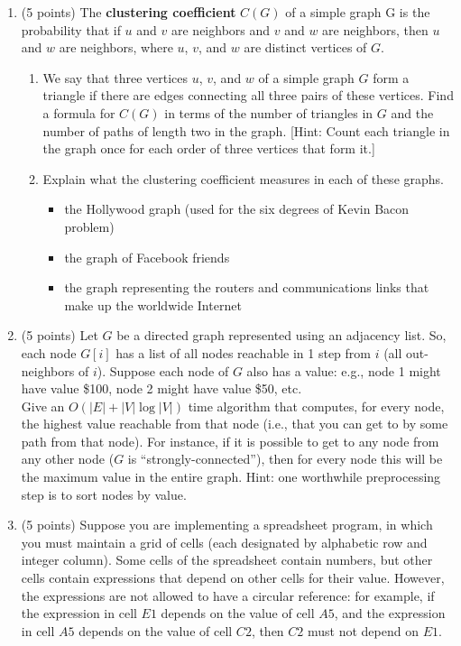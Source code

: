 \documentclass[12pt]{report}
\begin{document}
\maketitle

\begin{enumerate}[label=\arabic*.]
	\item (5 points) The \textbf{clustering coefficient} $C(G)$\label{def:cg} of a simple graph G is the probability that if $u$ and $v$ are neighbors and $v$ and $w$ are neighbors, then $u$ and $w$ are neighbors, where $u$, $v$, and $w$ are distinct vertices of $G$.
	\begin{enumerate}[label=\arabic{enumi}\alph*)]
	    \item We say that three vertices $u$, $v$, and $w$ of a simple graph $G$ form a triangle if there are edges connecting all three pairs of these vertices. Find a formula for \hyperref[def:cg]{$C(G)$} in terms of the number of triangles in $G$ and the number of paths of length two in the graph. [Hint: Count each triangle in the graph once for each order of three vertices that form it.]
		\item Explain what the clustering coefficient measures in each of these graphs.
		\begin{itemize}
			\item the Hollywood graph (used for the six degrees of Kevin Bacon problem)
			\item the graph of Facebook friends
			\item the graph representing the routers and communications links that make up the worldwide Internet
		\end{itemize}
	\end{enumerate}
	\item (5 points) Let $G$ be a directed graph represented using an adjacency list. So, each node $G[i]$ has a list of all nodes reachable in 1 step from $i$ (all out-neighbors of $i$). Suppose each node of $G$ also has a value: e.g., node 1 might have value \$100, node 2 might have value \$50, etc.\\
	Give an $O(|E| + |V | \log |V |)$ time algorithm that computes, for every node, the highest value reachable from that node (i.e., that you can get to by some path from that node). For instance, if it is possible to get to any node from any other node ($G$ is “strongly-connected”), then for every node this will be the maximum value in the entire graph. Hint: one worthwhile preprocessing step is to sort nodes by value.
	\item (5 points) Suppose you are implementing a spreadsheet program, in which you must maintain a grid of cells (each designated by alphabetic row and integer column). Some cells of the spreadsheet contain numbers, but other cells contain expressions that depend on other cells for their value. However, the expressions are not allowed to have a circular reference: for example, if the expression in cell $E1$ depends on the value of cell $A5$, and the expression in cell $A5$ depends on the value of cell $C2$, then $C2$ must not depend on $E1$.

\end{enumerate}
\end{document}
